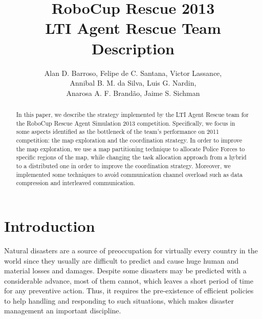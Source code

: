 \documentclass{llncs}
\begin{document}
\title{RoboCup Rescue 2013\\
       LTI Agent Rescue Team Description}
\author{Alan D. Barroso, Felipe de C. Santana, Victor Lassance,\\
		Annibal B. M. da Silva, Luis G. Nardin,\\
        Anarosa A. F. Brandão, Jaime S. Sichman}
\maketitle
\begin{abstract}
In this paper, we describe the strategy implemented by the LTI Agent Rescue team for the RoboCup Rescue Agent Simulation 2013 competition. Specifically, we focus in some aspects identified as the bottleneck of the team's performance on 2011 competition: the map exploration and the coordination strategy. In order to improve the map exploration, we use a map partitioning technique to allocate Police Forces to specific regions of the map, while changing the task allocation approach from a hybrid to a distributed one in order to improve the coordination strategy. Moreover, we implemented some techniques to avoid communication channel overload such as data compression and interleaved communication.
\end{abstract}
\section{Introduction}
\label{sec:introduction}
Natural disasters are a source of preoccupation for virtually every country in the world since they usually are difficult to predict and cause huge human and material losses and damages. Despite some disasters may be predicted with a considerable advance, most of them cannot, which leaves a short period of time for any preventive action. Thus, it requires the pre-existence of efficient policies to help handling and responding to such situations, which makes disaster management an important discipline. 
\end{document}
